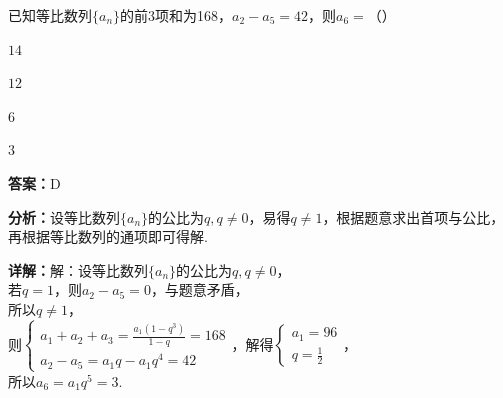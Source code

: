 \begin{question}[points=5]
已知等比数列$\{a_n\}$的前3项和为168，$a_2 - a_5 = 42$，则$a_6 =$（\qquad）
\begin{choices}
  \item $14$
  \item $12$
  \item $6$
  \item $3$
\end{choices}
\begin{solution}
\textbf{答案：}D

\textbf{分析：}设等比数列$\{a_n\}$的公比为$q, q\neq0$，易得$q\neq1$，根据题意求出首项与公比，再根据等比数列的通项即可得解.

\textbf{详解：}解：设等比数列$\{a_n\}$的公比为$q, q\neq0$，\\若$q=1$，则$a_2-a_5=0$，与题意矛盾，\\所以$q\neq1$，\\则$\begin{cases} a_1+a_2+a_3 = \frac{a_1(1-q^3)}{1-q} = 168 \\ a_2 - a_5 = a_1q - a_1q^4 = 42 \end{cases}$，解得$\begin{cases} a_1=96 \\ q=\frac{1}{2} \end{cases}$，\\所以$a_6 = a_1q^5 = 3$.
\end{solution}
\end{question}

